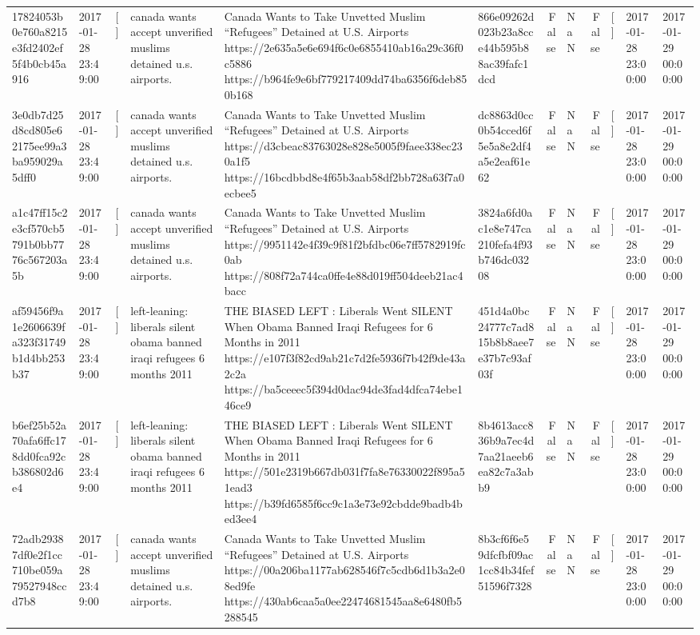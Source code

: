 \begin{tabular}{llllllrlrlll}
17824053b0e760a8215e3fd2402ef5f4b0cb45a916 & 2017-01-28 23:49:00 & [] & canada wants accept unverified muslims detained u.s. airports. & Canada Wants to Take Unvetted Muslim “Refugees” Detained at U.S. Airports https://2e635a5e6e694f6c0e6855410ab16a29c36f0c5886 https://b964fe9e6bf779217409dd74ba6356f6deb850b168 & 866e09262d023b23a8cce44b595b88ac39fafc1dcd & False & NaN & False & [] & 2017-01-28 23:00:00 & 2017-01-29 00:00:00 \\
3e0db7d25d8cd805e62175ee99a3ba959029a5dff0 & 2017-01-28 23:49:00 & [] & canada wants accept unverified muslims detained u.s. airports. & Canada Wants to Take Unvetted Muslim “Refugees” Detained at U.S. Airports https://d3cbeac83763028e828e5005f9faee338ec230a1f5 https://16bcdbbd8e4f65b3aab58df2bb728a63f7a0ecbee5 & dc8863d0cc0b54cced6f5e5a8e2df4a5e2eaf61e62 & False & NaN & False & [] & 2017-01-28 23:00:00 & 2017-01-29 00:00:00 \\
a1c47ff15c2e3cf570cb5791b0bb7776c567203a5b & 2017-01-28 23:49:00 & [] & canada wants accept unverified muslims detained u.s. airports. & Canada Wants to Take Unvetted Muslim “Refugees” Detained at U.S. Airports https://9951142e4f39c9f81f2bfdbc06e7ff5782919fc0ab https://808f72a744ca0ffe4e88d019ff504deeb21ac4bacc & 3824a6fd0ac1e8e747ca210fefa4f93b746dc03208 & False & NaN & False & [] & 2017-01-28 23:00:00 & 2017-01-29 00:00:00 \\
af59456f9a1e2606639fa323f31749b1d4bb253b37 & 2017-01-28 23:49:00 & [] & left-leaning: liberals silent obama banned iraqi refugees 6 months 2011 & THE BIASED LEFT : Liberals Went SILENT When Obama Banned Iraqi Refugees for 6 Months in 2011 https://e107f3f82cd9ab21c7d2fe5936f7b42f9de43a2c2a https://ba5ceeec5f394d0dac94de3fad4dfca74ebe146ce9 & 451d4a0bc24777c7ad815b8b8aee7e37b7c93af03f & False & NaN & False & [] & 2017-01-28 23:00:00 & 2017-01-29 00:00:00 \\
b6ef25b52a70afa6ffc178dd0fca92cb386802d6e4 & 2017-01-28 23:49:00 & [] & left-leaning: liberals silent obama banned iraqi refugees 6 months 2011 & THE BIASED LEFT : Liberals Went SILENT When Obama Banned Iraqi Refugees for 6 Months in 2011 https://501e2319b667db031f7fa8e76330022f895a51ead3 https://b39fd6585f6cc9c1a3e73e92cbdde9badb4bed3ee4 & 8b4613acc836b9a7ec4d7aa21aeeb6ea82c7a3abb9 & False & NaN & False & [] & 2017-01-28 23:00:00 & 2017-01-29 00:00:00 \\
72adb29387df0e2f1cc710be059a79527948ccd7b8 & 2017-01-28 23:49:00 & [] & canada wants accept unverified muslims detained u.s. airports. & Canada Wants to Take Unvetted Muslim “Refugees” Detained at U.S. Airports https://00a206ba1177ab628546f7c5cdb6d1b3a2e08ed9fe https://430ab6caa5a0ee22474681545aa8e6480fb5288545 & 8b3cf6f6e59dfcfbf09ac1cc84b34fef51596f7328 & False & NaN & False & [] & 2017-01-28 23:00:00 & 2017-01-29 00:00:00 \\

\end{tabular}

